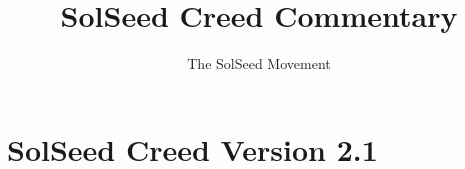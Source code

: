 \documentclass[ebook,12pt,openany,twoside]{memoir}
\begin{document}
\title{\textbf{SolSeed Creed Commentary}}
\author{The SolSeed Movement}
\begin{titlingpage}
\maketitle
\end{titlingpage}


\cleartorecto
\thispagestyle{cleared}

\pagestyle{plain}

\chapter{SolSeed Creed Version 2.1}
\end{document}

